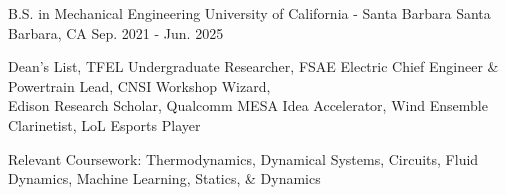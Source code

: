 


\begin{cventries}

\cventry
{B.S. in Mechanical Engineering} %
{University of California - Santa Barbara} %
{Santa Barbara, CA} %
{Sep. 2021 - Jun. 2025} %
{ %
\begin{cvitems}
\item {Dean's List, TFEL Undergraduate Researcher, FSAE Electric Chief Engineer \& Powertrain Lead, CNSI Workshop Wizard,  \\ Edison Research Scholar, Qualcomm MESA Idea Accelerator,  Wind Ensemble Clarinetist, LoL Esports Player}
\item {Relevant Coursework: Thermodynamics, Dynamical Systems, Circuits, Fluid Dynamics, Machine Learning, Statics, \& Dynamics}
\end{cvitems}
}





\end{cventries}